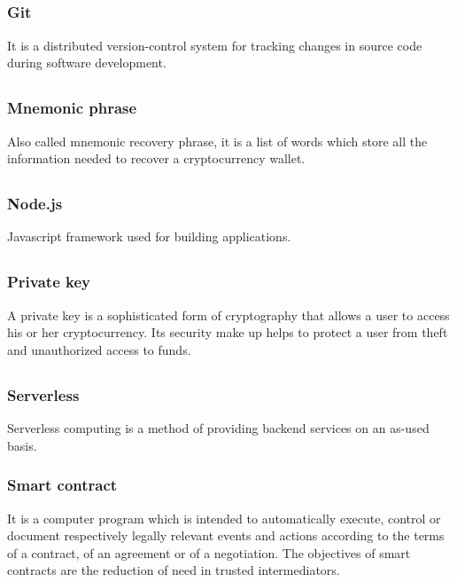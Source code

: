 	\subsection*{}
		\subsubsection*{Git}
			It is a distributed version-control system for tracking changes in source code during software development.
			
	\subsection*{}
		\subsubsection*{Mnemonic phrase}
			Also called mnemonic recovery phrase, it is a list of words which store all the information needed to recover a cryptocurrency wallet.
	
	\subsection*{}
		\subsubsection*{Node.js}
			Javascript framework used for building applications. 
	
	\subsection*{}
		\subsubsection*{Private key}
			A private key is a sophisticated form of cryptography that allows a user to access his or her cryptocurrency. Its security make up helps to protect a user from theft and unauthorized access to funds.
	
	\subsection*{}
		\subsubsection*{Serverless}
			Serverless computing is a method of providing backend services on an as-used basis.
		\subsubsection*{Smart contract}
			It is a computer program which is intended to automatically execute, control or document respectively legally relevant events and actions according to the terms of a contract, of an agreement or of a negotiation. The objectives of smart contracts are the reduction of need in trusted intermediators. 